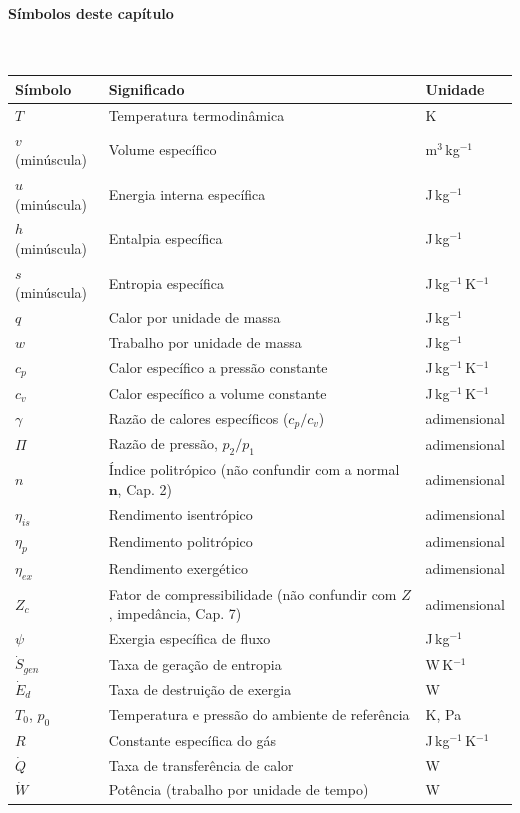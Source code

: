 \documentclass[12pt,a4paper]{article}
\numberwithin{equation}{section}
\numberwithin{table}{section}
\numberwithin{figure}{section}
\begin{document}
\paragraph{Símbolos deste capítulo}\mbox{}\\[-0.5em]
{\small
\begin{longtable}{>{\raggedright\arraybackslash}p{2.6cm} >{\raggedright\arraybackslash}p{9.2cm} >{\raggedright\arraybackslash}p{2.6cm}}
	\toprule
	\textbf{Símbolo} & \textbf{Significado} & \textbf{Unidade} \\ \midrule
	\endhead
	$T$ & Temperatura termodinâmica & K \\
	$v$ (minúscula) & Volume específico & m$^3$\,kg$^{-1}$ \\
	$u$ (minúscula) & Energia interna específica & J\,kg$^{-1}$ \\
	$h$ (minúscula) & Entalpia específica & J\,kg$^{-1}$ \\
	$s$ (minúscula) & Entropia específica & J\,kg$^{-1}$\,K$^{-1}$ \\
	$q$ & Calor por unidade de massa & J\,kg$^{-1}$ \\
	$w$ & Trabalho por unidade de massa & J\,kg$^{-1}$ \\
	$c_p$ & Calor específico a pressão constante & J\,kg$^{-1}$\,K$^{-1}$ \\
	$c_v$ & Calor específico a volume constante & J\,kg$^{-1}$\,K$^{-1}$ \\
	$\gamma$ & Razão de calores específicos ($c_p/c_v$) & adimensional \\
	$\Pi$ & Razão de pressão, $p_2/p_1$ & adimensional \\
	$n$ & Índice politrópico (não confundir com a normal $\mathbf{n}$, Cap. 2) & adimensional \\
	$\eta_{is}$ & Rendimento isentrópico & adimensional \\
	$\eta_p$ & Rendimento politrópico & adimensional \\
	$\eta_{ex}$ & Rendimento exergético & adimensional \\
	$Z_c$ & Fator de compressibilidade (não confundir com $Z$, impedância, Cap. 7) & adimensional \\
	$\psi$ & Exergia específica de fluxo & J\,kg$^{-1}$ \\
	$\dot{S}_{gen}$ & Taxa de geração de entropia & W\,K$^{-1}$ \\
	$\dot{E}_d$ & Taxa de destruição de exergia & W \\
	$T_0$, $p_0$ & Temperatura e pressão do ambiente de referência & K, Pa \\
	$R$ & Constante específica do gás & J\,kg$^{-1}$\,K$^{-1}$ \\
	$\dot{Q}$ & Taxa de transferência de calor & W \\
	$\dot{W}$ & Potência (trabalho por unidade de tempo) & W \\
	\bottomrule
\end{longtable}
}
\end{document}
